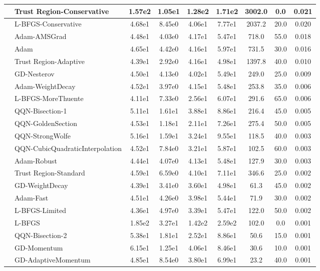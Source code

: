 \documentclass[10pt]{article}
\begin{document}
\begin{longtable}{|l|l|c|c|c|c|c|c|c|}
\hline
 & Trust Region-Conservative & 1.57e2 & 1.05e1 & 1.28e2 & 1.71e2 & 3002.0 & 0.0 & 0.021 \\
\hline
 & L-BFGS-Conservative & 4.68e1 & 8.45e0 & 4.06e1 & 7.77e1 & 2037.2 & 20.0 & 0.020 \\
\hline
 & Adam-AMSGrad & 4.48e1 & 4.03e0 & 4.17e1 & 5.47e1 & 718.0 & 55.0 & 0.018 \\
\hline
 & Adam & 4.65e1 & 4.42e0 & 4.16e1 & 5.97e1 & 731.5 & 30.0 & 0.016 \\
\hline
 & Trust Region-Adaptive & 4.39e1 & 2.92e0 & 4.16e1 & 4.98e1 & 1397.8 & 40.0 & 0.010 \\
\hline
 & GD-Nesterov & 4.50e1 & 4.13e0 & 4.02e1 & 5.49e1 & 249.0 & 25.0 & 0.009 \\
\hline
 & Adam-WeightDecay & 4.52e1 & 3.97e0 & 4.15e1 & 5.48e1 & 253.8 & 35.0 & 0.006 \\
\hline
 & L-BFGS-MoreThuente & 4.11e1 & 7.33e0 & 2.56e1 & 6.07e1 & 291.6 & 65.0 & 0.006 \\
\hline
 & QQN-Bisection-1 & 5.11e1 & 1.61e1 & 3.88e1 & 8.86e1 & 216.4 & 45.0 & 0.005 \\
\hline
 & QQN-GoldenSection & 4.53e1 & 1.18e1 & 2.11e1 & 7.26e1 & 275.4 & 50.0 & 0.005 \\
\hline
 & QQN-StrongWolfe & 5.16e1 & 1.59e1 & 3.24e1 & 9.55e1 & 118.5 & 40.0 & 0.003 \\
\hline
 & QQN-CubicQuadraticInterpolation & 4.52e1 & 7.84e0 & 3.21e1 & 5.87e1 & 102.5 & 60.0 & 0.003 \\
\hline
 & Adam-Robust & 4.44e1 & 4.07e0 & 4.13e1 & 5.48e1 & 127.9 & 30.0 & 0.003 \\
\hline
 & Trust Region-Standard & 4.59e1 & 6.59e0 & 4.10e1 & 7.11e1 & 346.6 & 25.0 & 0.002 \\
\hline
 & GD-WeightDecay & 4.39e1 & 3.41e0 & 3.60e1 & 4.98e1 & 61.3 & 45.0 & 0.002 \\
\hline
 & Adam-Fast & 4.51e1 & 4.26e0 & 3.98e1 & 5.44e1 & 71.9 & 30.0 & 0.002 \\
\hline
 & L-BFGS-Limited & 4.36e1 & 4.97e0 & 3.39e1 & 5.47e1 & 122.0 & 50.0 & 0.002 \\
\hline
 & L-BFGS & 1.85e2 & 3.27e1 & 1.42e2 & 2.59e2 & 102.0 & 0.0 & 0.001 \\
\hline
 & QQN-Bisection-2 & 5.38e1 & 1.81e1 & 2.52e1 & 8.86e1 & 50.6 & 15.0 & 0.001 \\
\hline
 & GD-Momentum & 6.15e1 & 1.25e1 & 4.06e1 & 8.46e1 & 30.6 & 10.0 & 0.001 \\
\hline
 & GD-AdaptiveMomentum & 4.85e1 & 8.54e0 & 3.80e1 & 6.99e1 & 23.2 & 40.0 & 0.001 \\

\end{longtable}
\end{document}
